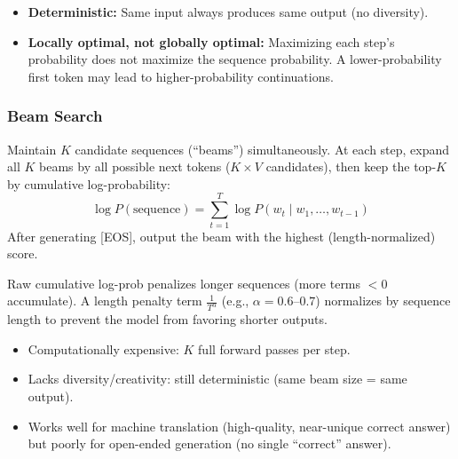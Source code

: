 \documentclass[11pt, a4paper]{article}
\begin{document}
\begin{warnbox}
\begin{itemize}[leftmargin=1.5em]
  \item \textbf{Deterministic:} Same input always produces same output (no diversity).
  \item \textbf{Locally optimal, not globally optimal:} Maximizing each step's probability does not maximize the sequence probability. A lower-probability first token may lead to higher-probability continuations.
\end{itemize}
\end{warnbox}

\subsubsection{Beam Search}

\begin{defbox}
Maintain $K$ candidate sequences (``beams'') simultaneously. At each step, expand all $K$ beams by all possible next tokens ($K \times V$ candidates), then keep the top-$K$ by cumulative log-probability:
\[
\log P(\text{sequence}) = \sum_{t=1}^{T} \log P(w_t \mid w_1, \ldots, w_{t-1})
\]
After generating [EOS], output the beam with the highest (length-normalized) score.
\end{defbox}

\begin{notebox}
Raw cumulative log-prob penalizes longer sequences (more terms $< 0$ accumulate). A length penalty term $\frac{1}{T^\alpha}$ (e.g., $\alpha = 0.6$--$0.7$) normalizes by sequence length to prevent the model from favoring shorter outputs.
\end{notebox}

\begin{warnbox}
\begin{itemize}[leftmargin=1.5em]
  \item Computationally expensive: $K$ full forward passes per step.
  \item Lacks diversity/creativity: still deterministic (same beam size = same output).
  \item Works well for machine translation (high-quality, near-unique correct answer) but poorly for open-ended generation (no single ``correct'' answer).
\end{itemize}
\end{warnbox}
\end{document}
